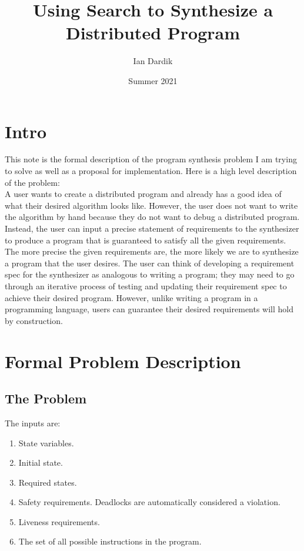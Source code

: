 \documentclass[12pt]{article}
\title{Using Search to Synthesize a Distributed Program}
\date{Summer 2021}
\author{Ian Dardik}
\begin{document}
\maketitle

\section{Intro}
This note is the formal description of the program synthesis problem I am trying to solve as well as a proposal for implementation.  Here is a high level description of the problem: \\

A user wants to create a distributed program and already has a good idea of what their desired algorithm looks like.  However, the user does not want to write the algorithm by hand because they do not want to debug a distributed program.  Instead, the user can input a precise statement of requirements to the synthesizer to produce a program that is guaranteed to satisfy all the given requirements.  The more precise the given requirements are, the more likely we are to synthesize a program that the user desires.  The user can think of developing a requirement spec for the synthesizer as analogous to writing a program; they may need to go through an iterative process of testing and updating their requirement spec to achieve their desired program.  However, unlike writing a program in a programming language, users can guarantee their desired requirements will hold by construction.  


\section{Formal Problem Description}
\subsection{The Problem}
The inputs are:
	\begin{enumerate}
		\item State variables.  
		\item Initial state.  
		\item Required states.  
		\item Safety requirements.  Deadlocks are automatically considered a violation.  
		\item Liveness requirements.  
		\item The set of all possible instructions in the program.  
	\end{enumerate}
\end{document}
